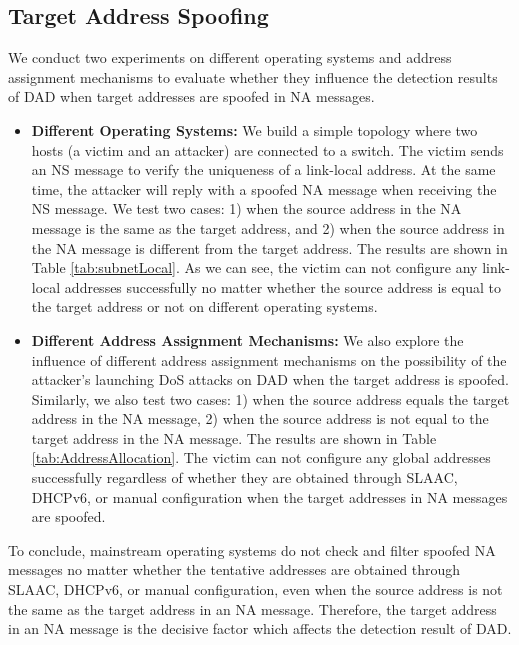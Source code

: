 \documentclass[journal]{IEEEtran}
\begin{document}
    \subsection{Target Address Spoofing}
        We conduct two experiments on different operating systems and address assignment mechanisms to evaluate whether they influence the detection results of DAD when target addresses are spoofed in NA messages.

        \begin{itemize}
            \item \textbf{Different Operating Systems:}
            We build a simple topology where two hosts (a victim and an attacker) are connected to a switch. The victim sends an NS message to verify the uniqueness of a link-local address. At the same time, the attacker will reply with a spoofed NA message when receiving the NS message. We test two cases: 1) when the source address in the NA message is the same as the target address, and 2) when the source address in the NA message is different from the target address.
            The results are shown in Table \ref{tab:subnetLocal}. As we can see, the victim can not configure any link-local addresses successfully no matter whether the source address is equal to the target address or not on different operating systems. 

            \item \textbf{Different Address Assignment Mechanisms:}
            We also explore the influence of different address assignment mechanisms on the possibility of the attacker's launching DoS attacks on DAD when the target address is spoofed. Similarly, we also test two cases: 1) when the source address equals the target address in the NA message, 2) when the source address is not equal to the target address in the NA message.
            The results are shown in Table \ref{tab:AddressAllocation}. The victim can not configure any global addresses successfully regardless of whether they are obtained through SLAAC, DHCPv6, or manual configuration when the target addresses in NA messages are spoofed.
        \end{itemize}

        To conclude, mainstream operating systems do not check and filter spoofed NA messages no matter whether the tentative addresses are obtained through SLAAC, DHCPv6, or manual configuration, even when the source address is not the same as the target address in an NA message. Therefore, the target address in an NA message is the decisive factor which affects the detection result of DAD.
\end{document}
